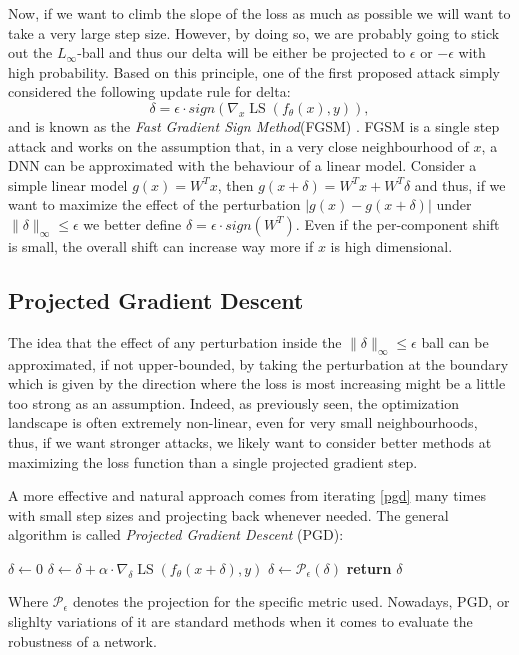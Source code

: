 \documentclass[LaM,binding=0.6cm]{./packages/sapthesis/sapthesis}
\begin{document}
        Now, if we want to climb the slope of the loss as much as possible we will want to take a very large step size. However, by doing so, we are probably going to stick out the $L_{\infty}$-ball
        and thus our delta will be either be projected to $\epsilon$ or $- \epsilon$ with high probability. Based on this principle, one of the first proposed attack simply considered the following update rule 
        for delta:
        \begin{equation}
            \delta = \epsilon \cdot sign(\nabla_{x} \operatorname{LS}\left(f_{\theta}(x), y\right)),
        \end{equation}
        and is known as the \textit{Fast Gradient Sign Method}(FGSM) \cite{goodfellow2014explaining}. FGSM is a single step attack and works on the assumption that, in a very close neighbourhood of $x$, a DNN can be approximated with the 
        behaviour of a linear model. Consider a simple linear model $ g(x)  = W^Tx $, then $g(x + \delta) = W^Tx + W^T\delta $ and thus, if we want to maximize the effect of the perturbation 
        $ |g(x) - g(x + \delta) | $ under $\|\delta\|_{\infty} \leq \epsilon$ we better define $\delta = \epsilon \cdot sign (W^T)$. Even if the per-component shift is small, the overall shift 
        can increase way more if $x$ is high dimensional.
        
    \subsection{Projected Gradient Descent}
    
        The idea that the effect of any perturbation inside the $\|\delta\|_\infty \leq \epsilon$ ball can be approximated, if not upper-bounded, by taking the perturbation at the boundary which
        is given by the direction where the loss is most increasing might be a little too strong as an assumption. Indeed, as previously seen, the optimization landscape is often extremely
        non-linear, even for very small neighbourhoods, thus, if we want stronger attacks, we likely want to consider better methods at maximizing the loss function than a single projected gradient step.

        A more effective and natural approach comes from iterating \ref{pgd} many times with small step sizes and projecting back whenever needed. The general algorithm is called \textit{Projected Gradient
        Descent} (PGD)\cite{madry_adv_training}:


            \begin{algorithmic}[0]
            \State $\delta \gets 0$
            \State $\delta \gets \delta + \alpha \cdot \nabla_{\delta} \operatorname{LS}\left(f_{\theta}(x+\delta), y\right)$
            \State $\delta \gets \mathcal{P_{\epsilon}}(\delta) $
            \EndFor
            \State \textbf{return} $\delta$
            \EndProcedure
            \end{algorithmic}
        Where $\mathcal{P_{\epsilon}}$ denotes the projection for the specific metric used. Nowadays, PGD, or slighlty variations of it are standard methods when 
        it comes to evaluate the robustness of a network.
\end{document}
